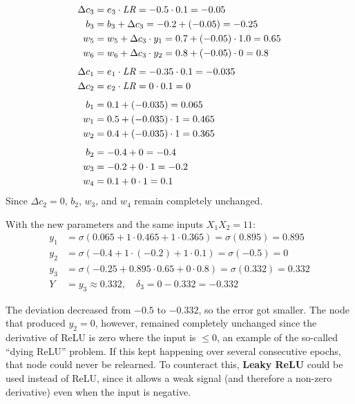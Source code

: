 \begin{align*}
  \Delta c_3 &= e_3 \cdot \mathit{LR} = -0.5 \cdot 0.1 = -0.05 \\
  b_3 &= b_3 + \Delta c_3 = -0.2 + (-0.05) = -0.25 \\
  w_5 &= w_5 + \Delta c_3 \cdot y_1 = 0.7 + (-0.05) \cdot 1.0 = 0.65 \\
  w_6 &= w_6 + \Delta c_3 \cdot y_2 = 0.8 + (-0.05) \cdot 0 = 0.8 \\[1ex]
  \Delta c_1 &= e_1 \cdot \mathit{LR} = -0.35 \cdot 0.1 = -0.035 \\
  \Delta c_2 &= e_2 \cdot \mathit{LR} = 0 \cdot 0.1 = 0 \\[1ex]
  b_1 &= 0.1 + (-0.035) = 0.065 \\
  w_1 &= 0.5 + (-0.035) \cdot 1 = 0.465 \\
  w_2 &= 0.4 + (-0.035) \cdot 1 = 0.365 \\[1ex]
  b_2 &= -0.4 + 0 = -0.4 \\
  w_3 &= -0.2 + 0 \cdot 1 = -0.2 \\
  w_4 &= 0.1 + 0 \cdot 1 = 0.1
\end{align*}
Since $\Delta c_2 = 0$, $b_2$, $w_3$, and $w_4$ remain completely unchanged.

With the new parameters and the same inputs $X_1X_2 = 11$:
\begin{align*}
  y_1 &= \sigma(0.065 + 1 \cdot 0.465 + 1 \cdot 0.365) = \sigma(0.895) = 0.895 \\
  y_2 &= \sigma(-0.4 + 1 \cdot (-0.2) + 1 \cdot 0.1) = \sigma(-0.5) = 0 \\
  y_3 &= \sigma(-0.25 + 0.895 \cdot 0.65 + 0 \cdot 0.8) = \sigma(0.332) = 0.332 \\
  Y &= y_3 \approx 0.332, \quad \delta_3 = 0 - 0.332 = -0.332
\end{align*}

The deviation decreased from $-0.5$ to $-0.332$, so the error got smaller. The node that produced
$y_2 = 0$, however, remained completely unchanged since the derivative of ReLU is zero where the
input is $\leq 0$, an example of the so-called ``dying ReLU'' problem. If this kept happening over
several consecutive epochs, that node could never be relearned. To counteract this,
\textbf{Leaky ReLU} could be used instead of ReLU, since it allows a weak signal (and therefore a
non-zero derivative) even when the input is negative.

